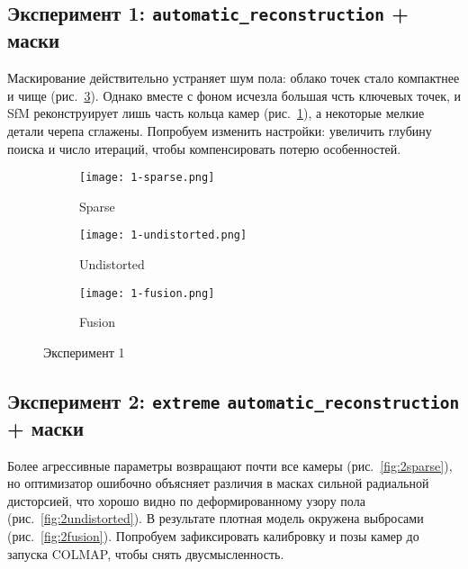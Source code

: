 \subsection{Эксперимент 1: \texttt{automatic\_reconstruction} + маски}

Маскирование действительно устраняет шум пола:
облако точек стало компактнее и чище
(рис.~\ref{fig:1fusion}). Однако вместе с фоном
исчезла большая чсть ключевых точек, и SfM реконструирует
лишь часть кольца камер (рис.~\ref{fig:1sparse}),
а некоторые мелкие детали черепа сглажены. Попробуем изменить настройки:
увеличить глубину поиска и число итераций, чтобы компенсировать потерю особенностей.

\begin{figure}[h]
    \centering
    \begin{subfigure}[b]{0.3\textwidth}
        \texttt{[image: 1-sparse.png]}
        \caption{Sparse}
        \label{fig:1sparse}
    \end{subfigure}
    \hfill
    \begin{subfigure}[b]{0.3\textwidth}
        \texttt{[image: 1-undistorted.png]}
        \caption{Undistorted}
        \label{fig:1undistorted}
    \end{subfigure}
    \hfill
    \begin{subfigure}[b]{0.3\textwidth}
        \texttt{[image: 1-fusion.png]}
        \caption{Fusion}
        \label{fig:1fusion}
    \end{subfigure}
    \caption{Эксперимент 1}
    \label{fig:1exp}
\end{figure}

\subsection{Эксперимент 2: \texttt{extreme} \texttt{automatic\_reconstruction} + маски}

Более агрессивные параметры возвращают почти все камеры
(рис.~\ref{fig:2sparse}), но оптимизатор ошибочно
объясняет различия в масках сильной радиальной дисторсией,
что хорошо видно по деформированному узору пола
(рис.~\ref{fig:2undistorted}). В результате
плотная модель окружена выбросами (рис.~\ref{fig:2fusion}).
Попробуем зафиксировать калибровку и позы камер
до запуска COLMAP, чтобы снять двусмысленность.

